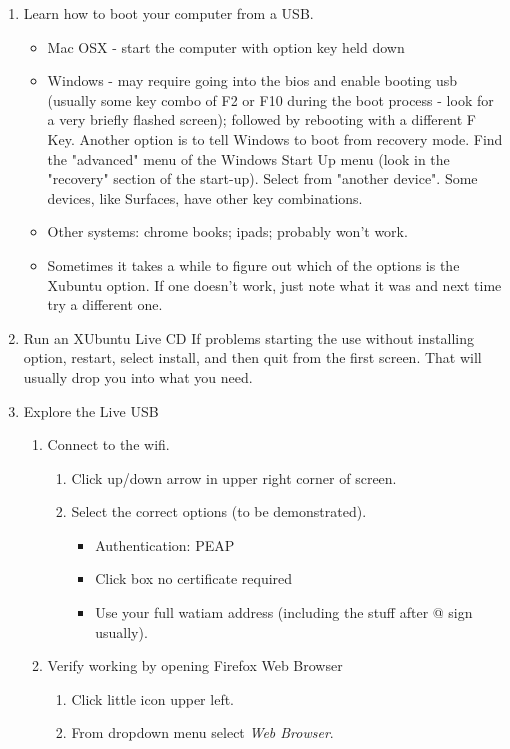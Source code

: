 \documentclass{article}
\begin{document}
\begin{enumerate}
\item Learn how to boot your computer from a USB. 
\begin{itemize}
\item Mac OSX - start the computer with option key held down
\item Windows - may require going into the bios and enable booting usb (usually some key combo of F2 or F10 during the boot process - look for a very briefly flashed screen); followed by rebooting with a different F Key. Another option is to tell Windows to boot from recovery mode. Find the "advanced" menu of the Windows Start Up menu (look in the "recovery" section of the start-up). Select from "another device". Some devices, like Surfaces, have other key combinations.
\item Other systems: chrome books; ipads; probably won't work.
\item Sometimes it takes a while to figure out which of the options is the Xubuntu option. If one doesn't work, just note what it was and next time try a different one.
\end{itemize}
\item Run an XUbuntu Live CD
If problems starting the use without installing option, restart, select install, and then quit from the first screen. That will usually drop you into what you need.
\item Explore the Live USB
\begin{enumerate}
\item Connect to the wifi.
\begin{enumerate}
\item Click up/down arrow in upper right corner of screen.
\item Select the correct options (to be demonstrated).
\begin{itemize}
\item Authentication: PEAP
\item Click box no certificate required
\item Use your full watiam address (including the stuff after @ sign usually).
\end{itemize}
\end{enumerate}
\item Verify working by opening Firefox Web Browser
\begin{enumerate}
\item Click little icon upper left.
\item From dropdown menu select \emph{Web Browser}.

\end{enumerate}
\end{enumerate}
\end{enumerate}
\end{document}
